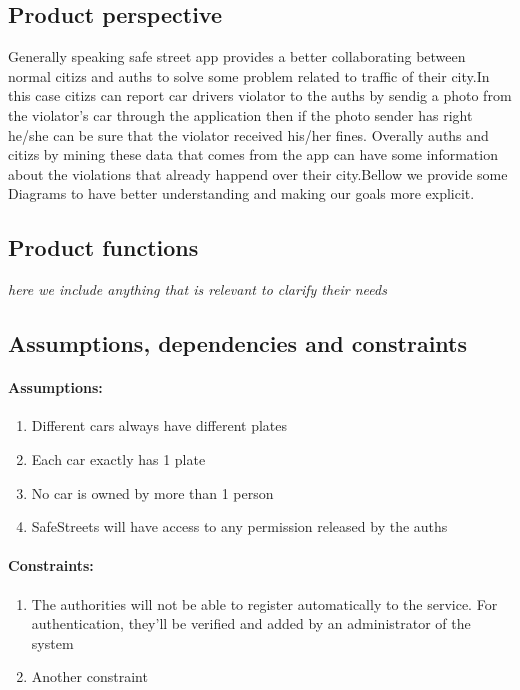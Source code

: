 \documentclass{article}
\newcommand{\enum}[1]{\texttt{#1.\arabic*}}
\begin{document}
	\subsection{Product perspective} Generally speaking safe street app provides a better collaborating between normal citizs and auths to solve some problem related to traffic of their city.In this case citizs can report car drivers violator to the auths by sendig a photo from the violator's car through the application then if the photo sender has right he/she can be sure that the violator received his/her fines. Overally auths and citizs by mining these data that comes from the app can have some information about the violations that already happend over their city.Bellow we provide some Diagrams to have better understanding and making our goals more explicit.  
	
	\subsection{Product functions}\textit{here we include anything that is relevant to clarify their needs}
	
	\subsection{Assumptions, dependencies and constraints}
	
	\paragraph{Assumptions:}
		\begin{enumerate}[label=\enum{A}]
			\item \label{A_disjPlates} Different cars always have different plates
			\item \label{A_Single plate}Each car exactly has 1 plate
			\item \label{A_singleOwner}No car is owned by more than 1 person
			\item \label{A_accessiblePermissions}SafeStreets will have access to any permission released by the auths
		\end{enumerate}
	
	\paragraph{Constraints:}
		\begin{enumerate}[label=\enum{C}]
			\item The authorities will not be able to register automatically to the service. For authentication, they'll be verified and added by an administrator of the system
			\item Another constraint
		\end{enumerate}
	
\end{document}
